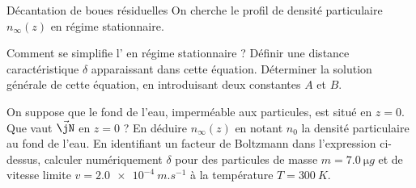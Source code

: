 \begin{exo}[PC][2][TD]{Décantation de boues résiduelles}
On cherche le profil de densité particulaire $n_\infty(z)$ en régime stationnaire.
\begin{quest}
\item Comment se simplifie l' en régime stationnaire ? Définir une distance caractéristique $\delta$ apparaissant dans cette équation.
Déterminer la solution générale de cette équation, en introduisant deux constantes $A$ et $B$.
\item On suppose que le fond de l'eau, imperméable aux particules, est situé en $z=0$. Que vaut $\Vec{\jN}$ en $z=0$ ?
En déduire $n_{\infty}(z)$ en notant $n_0$ la densité particulaire au fond de l'eau. En identifiant un facteur de Boltzmann dans l'expression ci-dessus, calculer numériquement $\delta$ pour des particules de masse $m=\SI{7.0}{\micro g}$ et de vitesse limite $v=\SI{2.0e-4}{m.s^{-1}}$ à la température $T = \SI{300}{K}$.
\end{quest}
\end{exo}


